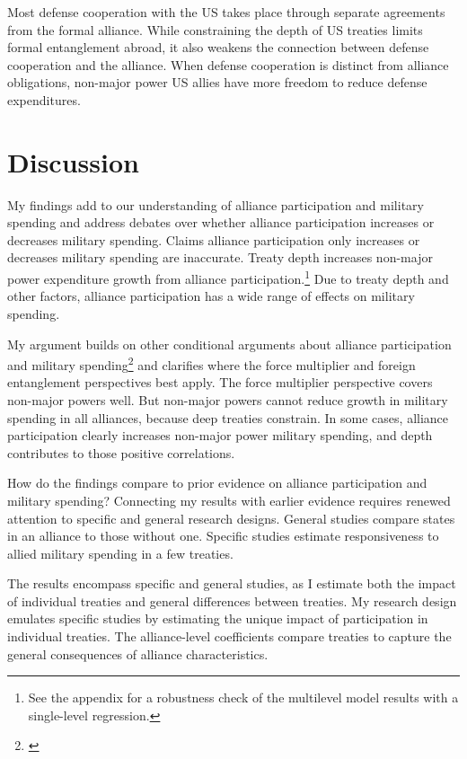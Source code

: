 \documentclass[12pt]{article}
\begin{document}
Most defense cooperation with the US takes place through separate agreements from the formal alliance. 
While constraining the depth of US treaties limits formal entanglement abroad, it also weakens the connection between defense cooperation and the alliance. 
When defense cooperation is distinct from alliance obligations, non-major power US allies have more freedom to reduce defense expenditures. 



\section{Discussion}


My findings add to our understanding of alliance participation and military spending and address debates over whether alliance participation increases or decreases military spending. 
Claims alliance participation only increases or decreases military spending are inaccurate. 
Treaty depth increases non-major power expenditure growth from alliance participation.\footnote{See the appendix for a robustness check of the multilevel model results with a single-level regression.}
Due to treaty depth and other factors, alliance participation has a wide range of effects on military spending. 


My argument builds on other conditional arguments about alliance participation and military spending\footnote{\cite{DigiuseppePoast2016}} and clarifies where the force multiplier and foreign entanglement perspectives best apply. 
The force multiplier perspective covers non-major powers well. 
But non-major powers cannot reduce growth in military spending in all alliances, because deep treaties constrain.
In some cases, alliance participation clearly increases non-major power military spending, and depth contributes to those positive correlations. 


How do the findings compare to prior evidence on alliance participation and military spending? 
Connecting my results with earlier evidence requires renewed attention to specific and general research designs. 
General studies compare states in an alliance to those without one. 
Specific studies estimate responsiveness to allied military spending in a few treaties. 


The results encompass specific and general studies, as I estimate both the impact of individual treaties and general differences between treaties. 
My research design emulates specific studies by estimating the unique impact of participation in individual treaties. 
The alliance-level coefficients compare treaties to capture the general consequences of alliance characteristics. 
\end{document}
